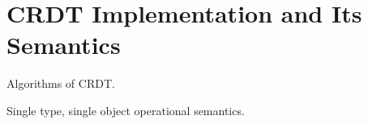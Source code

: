 
\section{CRDT Implementation and Its Semantics}
\label{sec:CRDT implementation and its semantics} 

Algorithms of CRDT. 

Single type, single object operational semantics. 





